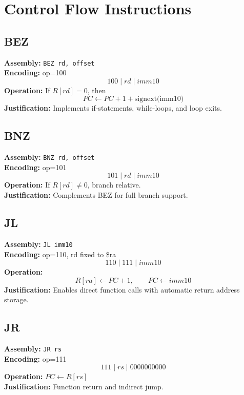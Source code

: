 \documentclass[12pt]{report}
\begin{document}
\section{Control Flow Instructions}

\subsection*{BEZ}
\textbf{Assembly:} \texttt{BEZ rd, offset} \\
\textbf{Encoding:} op=100 
\[
100 \;|\; rd \;|\; imm10
\]
\textbf{Operation:} If \( R[rd] = 0 \), then  
\[
PC \leftarrow PC + 1 + \text{signext(imm10)}
\]
\textbf{Justification:} Implements if-statements, while-loops, and loop exits.

\vspace{1em}

\subsection*{BNZ}
\textbf{Assembly:} \texttt{BNZ rd, offset} \\
\textbf{Encoding:} op=101 
\[
101 \;|\; rd \;|\; imm10
\]
\textbf{Operation:} If \( R[rd] \neq 0 \), branch relative. \\
\textbf{Justification:} Complements BEZ for full branch support.

\vspace{1em}

\subsection*{JL}
\textbf{Assembly:} \texttt{JL imm10} \\
\textbf{Encoding:} op=110, rd fixed to \$ra 
\[
110 \;|\; 111 \;|\; imm10
\]
\textbf{Operation:}  
\[
R[ra] \leftarrow PC + 1, \qquad PC \leftarrow imm10
\]
\textbf{Justification:} Enables direct function calls with automatic return address storage.

\vspace{1em}

\subsection*{JR}
\textbf{Assembly:} \texttt{JR rs} \\
\textbf{Encoding:} op=111 
\[
111 \;|\; rs \;|\; 0000000000
\]
\textbf{Operation:} \( PC \leftarrow R[rs] \) \\
\textbf{Justification:} Function return and indirect jump.
\end{document}

